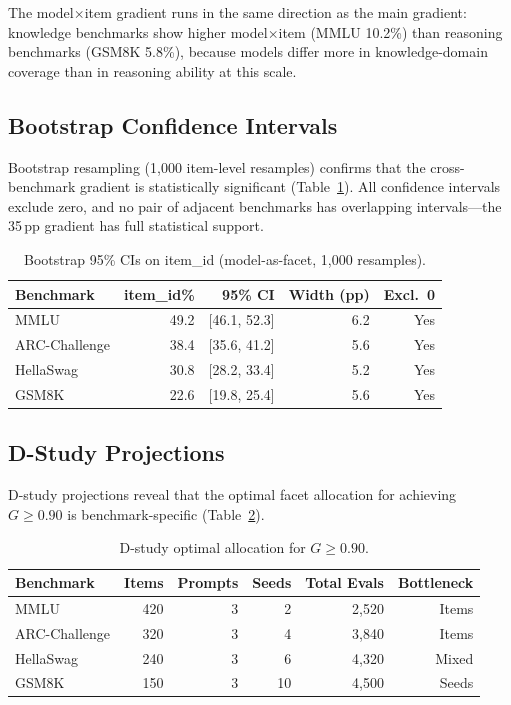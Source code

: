 \documentclass[11pt]{article}
\newcommand{\pp}{\,\text{pp}}
\begin{document}
The model$\times$item gradient runs in the same direction as the main gradient: knowledge benchmarks show higher model$\times$item (MMLU 10.2\%) than reasoning benchmarks (GSM8K 5.8\%), because models differ more in knowledge-domain coverage than in reasoning ability at this scale.

\subsection{Bootstrap Confidence Intervals}

Bootstrap resampling (1{,}000 item-level resamples) confirms that the cross-benchmark gradient is statistically significant (Table~\ref{tab:bootstrap}). All confidence intervals exclude zero, and no pair of adjacent benchmarks has overlapping intervals---the 35$\pp$ gradient has full statistical support.

\begin{table}[t]
\centering
\caption{Bootstrap 95\% CIs on item\_id (model-as-facet, 1{,}000 resamples).}
\label{tab:bootstrap}
\small
\begin{tabular}{lrrrr}
\toprule
Benchmark & item\_id\% & 95\% CI & Width (pp) & Excl.\ 0 \\
\midrule
MMLU & 49.2 & [46.1, 52.3] & 6.2 & Yes \\
ARC-Challenge & 38.4 & [35.6, 41.2] & 5.6 & Yes \\
HellaSwag & 30.8 & [28.2, 33.4] & 5.2 & Yes \\
GSM8K & 22.6 & [19.8, 25.4] & 5.6 & Yes \\
\bottomrule
\end{tabular}
\end{table}

\subsection{D-Study Projections}
\label{sec:dstudy}

D-study projections reveal that the optimal facet allocation for achieving $G \geq 0.90$ is benchmark-specific (Table~\ref{tab:dstudy}).

\begin{table}[t]
\centering
\caption{D-study optimal allocation for $G \geq 0.90$.}
\label{tab:dstudy}
\small
\begin{tabular}{lrrrrr}
\toprule
Benchmark & Items & Prompts & Seeds & Total Evals & Bottleneck \\
\midrule
MMLU & 420 & 3 & 2 & 2{,}520 & Items \\
ARC-Challenge & 320 & 3 & 4 & 3{,}840 & Items \\
HellaSwag & 240 & 3 & 6 & 4{,}320 & Mixed \\
GSM8K & 150 & 3 & 10 & 4{,}500 & Seeds \\
\bottomrule
\end{tabular}
\end{table}
\end{document}
